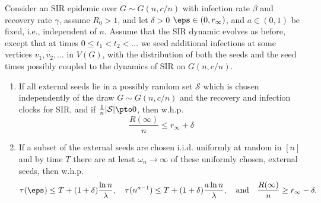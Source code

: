 \documentclass[11pt]{article}
\begin{document}
\begin{lemma}\label{lem:singlecomm-multipleseeds}
    Consider an SIR epidemic over $G\sim G(n,c/n)$ with infection rate $\beta$ and recovery rate $\gamma$, assume $R_0>1$, and  let $\delta>0$ $\eps\in(0,r_\infty)$, and $a\in (0,1)$ be fixed, i.e., independent of $n$.  Assume that  the SIR dynamic evolves as before, except that at times $0\leq t_1<t_2<\dots$ we seed additional infections at some vertices $v_1,v_2,\dots$ in $V(G)$, with the distribution of both the seeds and the seed times possibly coupled to the dynamics of SIR on $G(n,c/n)$.
    \begin{enumerate}
        \item\label{multi-seed-upperbd} %
        If all external seeds lie in a possibly random set
         $\mathcal S$ which is chosen independently of the draw $G\sim G(n,c/n)$ and the recovery and infection clocks for SIR, and if $\frac 1n|\mathcal S|\pto 0$, then w.h.p.
        $$\frac{R(\infty)}{n} \leq r_\infty +\delta
        $$
        \item\label{multi-seed-lowerbd} If a subset of the external seeds are chosen i.i.d. uniformly at random in $[n]$ and by time $T$ there are at least $\omega_n\to\infty$ of these uniformly chosen, external seeds, then w.h.p.
        \begin{equation}\label{eq:seed_lemma_2}
            \tau(\eps) \le T + (1+\delta)\frac{\ln n}{\lambda},\quad
            \tau(n^{a-1}) \le T + (1+\delta)\frac{a\ln n}{\lambda},
            \quad\text{and}\quad \frac{R(\infty)}{n} \geq r_\infty -\delta.
        \end{equation}
    \end{enumerate}
\end{lemma}
\end{document}
